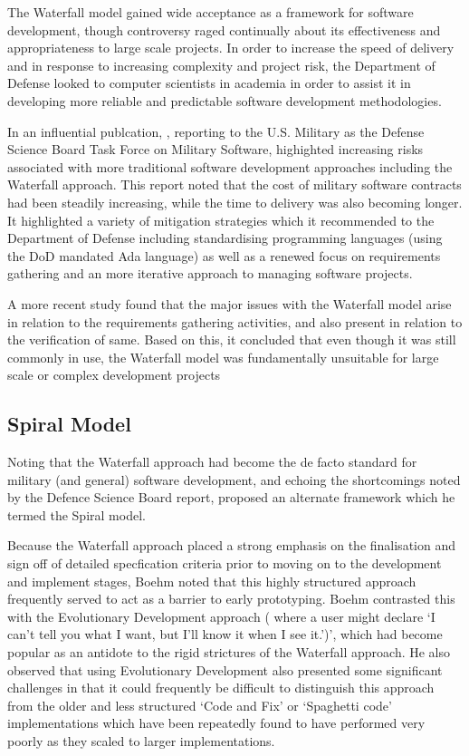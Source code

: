 \documentclass[a4paper,12pt]{article}
\begin{document}
\begin{samepage}
\begin{samepage}
The Waterfall model gained wide acceptance as a framework for software development, though controversy raged continually about its effectiveness and appropriateness to large scale projects. In order to increase the speed of delivery and in response to increasing complexity and project risk, the Department of Defense looked to computer scientists in academia in order to assist it in developing more reliable and predictable software development methodologies. 

In an influential publcation, \parencite{defensesscienceboard}, reporting to the U.S. Military as the Defense Science Board Task Force on Military Software, highighted increasing risks associated with more traditional software development approaches including the Waterfall approach. This report noted that the cost of military software contracts had been steadily increasing, while the time to delivery was also becoming longer. It highlighted a variety of mitigation strategies which it recommended to the Department of Defense including standardising programming languages (using the DoD mandated Ada language) as well as a renewed focus on requirements gathering and an more iterative approach to managing software projects.

A more recent study \parencite{peterson} found that the major issues with the Waterfall model arise in relation to the requirements gathering activities, and also present in relation to the verification of same. Based on this, it concluded that even though it was still commonly in use, the Waterfall model was fundamentally unsuitable for large scale or complex development projects

\subsection {Spiral Model}
Noting that the Waterfall approach had become the de facto standard for military (and general) software development, and echoing the shortcomings noted by the Defence Science Board report, \parencite{boehm} proposed an alternate framework which he termed the Spiral model. 

Because the Waterfall approach placed a strong emphasis on the finalisation and sign off of detailed specfication criteria prior to moving on to the development and implement stages, Boehm noted that this highly structured approach frequently served to act as a barrier to early prototyping. Boehm contrasted this with the Evolutionary Development approach ( where a user might declare `I can’t tell you what I want, but I’ll know it when I see it.')', which had become popular as an antidote to the rigid strictures of the Waterfall approach. He also observed that using  Evolutionary Development also presented some significant challenges in that it could frequently be difficult to distinguish this approach from the older and less structured `Code and Fix' or `Spaghetti code' implementations which have been repeatedly found to have performed very poorly as they scaled to larger implementations.


\end{samepage}
\end{samepage}
\end{document}
